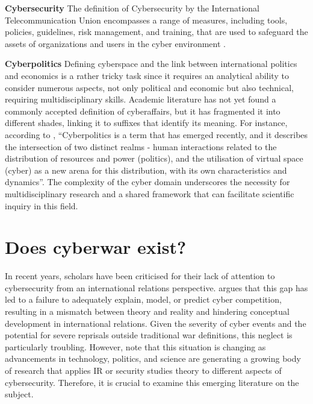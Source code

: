 \vspace{0.2cm}
\textbf{Cybersecurity} The definition of Cybersecurity by the International Telecommunication Union encompasses a range of measures, including tools, policies, guidelines, risk management, and training, that are used to safeguard the assets of organizations and users in the cyber environment \autocite[2]{internationaltelecommunicationunion_2008_recommendation}. 

\vspace{0.2cm}

\textbf{Cyberpolitics} Defining cyberspace and the link between international politics and economics is a rather tricky task since it requires an analytical ability to consider numerous aspects, not only political and economic but also technical, requiring multidisciplinary skills. Academic literature has not yet found a commonly accepted definition of cyberaffairs, but it has fragmented it into different shades, linking it to suffixes that identify its meaning. For instance, according to \textcite[4]{nazlichoucri_2012_cyberpolitics}, “Cyberpolitics is a term that has emerged recently, and it describes the intersection of two distinct realms - human interactions related to the distribution of resources and power (politics), and the utilisation of virtual space (cyber) as a new arena for this distribution, with its own characteristics and dynamics”. The complexity of the cyber domain underscores the necessity for multidisciplinary research and a shared framework that can facilitate scientific inquiry in this field. 

\section{Does cyberwar exist?} 
In recent years, scholars have been criticised for their lack of attention to cybersecurity from an international relations perspective. \textcite{kello_2013_the}  argues that this gap has led to a failure to adequately explain, model, or predict cyber competition, resulting in a mismatch between theory and reality and hindering conceptual development in international relations. Given the severity of cyber events and the potential for severe reprisals outside traditional war definitions, this neglect is particularly troubling. However, \textcite{cavelty_2020_cyber} note that this situation is changing as advancements in technology, politics, and science are generating a growing body of research that applies IR or security studies theory to different aspects of cybersecurity. Therefore, it is crucial to examine this emerging literature on the subject. 



